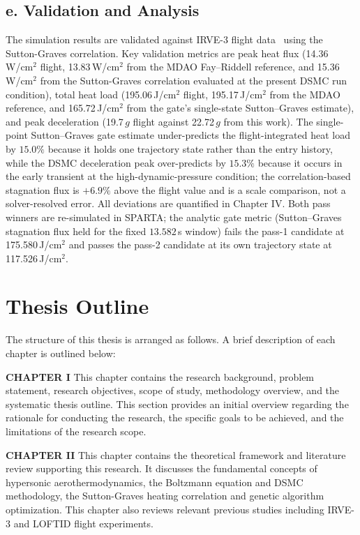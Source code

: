 \subsection*{e. Validation and Analysis}
The simulation results are validated against IRVE-3 flight data~\cite{rapisarda2023mdao} using the Sutton-Graves correlation. Key validation metrics are peak heat flux (14.36\,W/cm$^2$ flight, 13.83\,W/cm$^2$ from the MDAO Fay--Riddell reference, and 15.36\,W/cm$^2$ from the Sutton-Graves correlation evaluated at the present DSMC run condition), total heat load (195.06\,J/cm$^2$ flight, 195.17\,J/cm$^2$ from the MDAO reference, and 165.72\,J/cm$^2$ from the gate's single-state Sutton--Graves estimate), and peak deceleration (19.7\,$g$ flight against 22.72\,$g$ from this work). The single-point Sutton--Graves gate estimate under-predicts the flight-integrated heat load by $15.0\%$ because it holds one trajectory state rather than the entry history, while the DSMC deceleration peak over-predicts by $15.3\%$ because it occurs in the early transient at the high-dynamic-pressure condition; the correlation-based stagnation flux is $+6.9\%$ above the flight value and is a scale comparison, not a solver-resolved error. All deviations are quantified in Chapter IV. Both pass winners are re-simulated in SPARTA; the analytic gate metric (Sutton--Graves stagnation flux held for the fixed $13.582$\,s window) fails the pass-1 candidate at 175.580\,J/cm$^2$ and passes the pass-2 candidate at its own trajectory state at 117.526\,J/cm$^2$.

\section{Thesis Outline}
The structure of this thesis is arranged as follows. A brief description of each chapter is outlined below:

\textbf{CHAPTER I} This chapter contains the research background, problem statement, research objectives, scope of study, methodology overview, and the systematic thesis outline. This section provides an initial overview regarding the rationale for conducting the research, the specific goals to be achieved, and the limitations of the research scope.

\textbf{CHAPTER II} This chapter contains the theoretical framework and literature review supporting this research. It discusses the fundamental concepts of hypersonic aerothermodynamics, the Boltzmann equation and DSMC methodology, the Sutton-Graves heating correlation and genetic algorithm optimization. This chapter also reviews relevant previous studies including IRVE-3 and LOFTID flight experiments.

